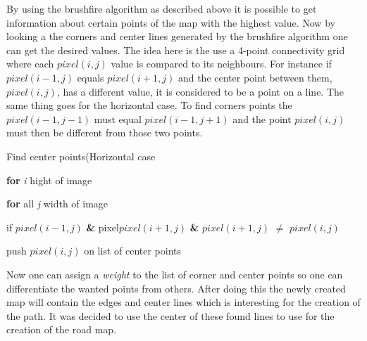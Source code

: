 \documentclass[../Head/Main.tex]{subfiles}
\begin{document}
By using the brushfire algorithm as described above it is possible to get information about certain points of the map with the highest value. Now by looking a the corners and center lines generated by the brushfire algorithm one can get the desired values. The idea here is the use a 4-point connectivity grid where each $pixel(i,j)$ value is compared to its neighbours. For instance if $pixel(i-1,j)$ equals $pixel(i+1,j)$ and the center point between them, $pixel(i,j)$, has a different value, it is considered to be a point on a line. The same thing goes for the horizontal case. To find corners points the$pixel(i-1,j-1)$ must equal $pixel(i-1,j+1)$ and the point $pixel(i,j)$ must then be different from those two points.

\begin{Pseudo}{Find center points(Horizontal case}{}

 	\textbf{for} \textit{i} hight of image 
	\begin{Indentation}
		\item 
	\begin{Indentation}
	\item \textbf{for} all \textit{j} width of image 
	\item if $pixel(i-1,j)$ \textbf{\&} pixel$pixel(i+1,j)$ \textbf{\&} $pixel(i+1,j)$ $\neq$ $pixel(i,j)$ 
	\item push $pixel(i,j)$ on list of center points
	\end{Indentation}
	
	
	\end{Indentation}
	
\end{Pseudo}
   
Now one can assign a \textit{weight} to the list of corner and center points so one can differentiate the wanted points from others. After doing this the newly created map will contain the edges and center lines which is interesting for the creation of the path. It was decided to use the center of these found lines to use for the creation of the road map.  
\end{document}
